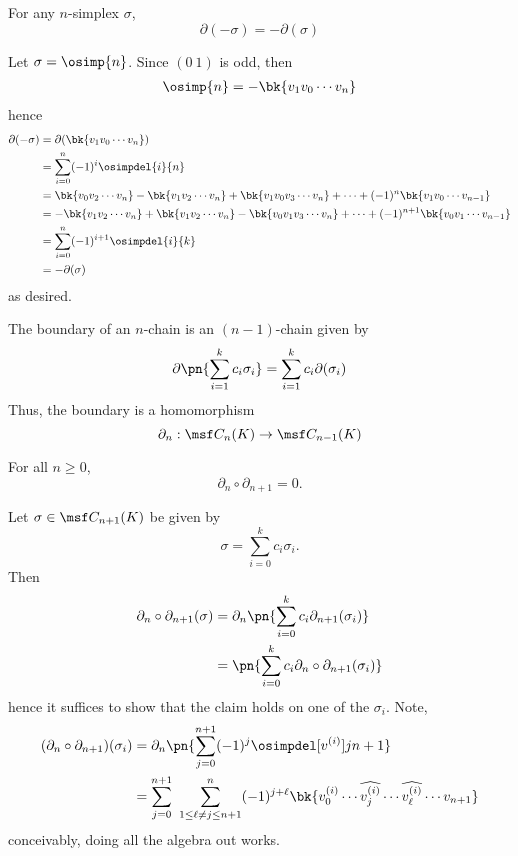 \begin{problem}[18.3]
  For any $n$-simplex $\sigma$,
  \[
    \partial(-\sigma) = -\partial(\sigma)
  \]
\end{problem}
\begin{solution}
  Let $\sigma = \osimp{n}$. Since $(0\ 1)$ is odd, then
  \begin{align*}
    \osimp{n} = -\bk{v_1v_0\cdots v_n}
  \end{align*}
  hence
  \begin{align*}
    \partial(-\sigma)
    &= \partial(\bk{v_1v_0\cdots v_n}) \\
    &= \sum_{i=0}^n (-1)^i \osimpdel{i}{n} \\
    &= \bk{v_0v_2\cdots v_n} - \bk{v_1v_2 \cdots v_n} + \bk{v_1v_0v_3\cdots v_n} + \cdots + (-1)^n\bk{v_1v_0\cdots v_{n-1}} \\
    &= -\bk{v_1v_2\cdots v_n} + \bk{v_1v_2 \cdots v_n} - \bk{v_0v_1v_3\cdots v_n} + \cdots + (-1)^{n+1}\bk{v_0v_1\cdots v_{n-1}} \\
    &= \sum_{i=0}^n (-1)^{i+1} \osimpdel{i}{k} \\
    &= -\partial(\sigma)
  \end{align*}
  as desired.
\end{solution}
\begin{definition}
  The boundary of an $n$-chain is an $(n-1)$-chain given by
  \[
    \partial\pn{\sum_{i=1}^k c_i \sigma_i}
    = \sum_{i=1}^k c_i\partial(\sigma_i)
  \]
  Thus, the boundary is a homomorphism
  \[
    \partial_n : \msf C_n(K) \to \msf C_{n-1}(K)
  \]
\end{definition}
\begin{problem}[18.4]
  For all $n \geq 0$,
  \[
    \partial_n \circ \partial_{n+1}=0.
  \]
\end{problem}
\begin{solution}
  Let $\sigma \in \msf C_{n+1}(K)$ be given by
  \[
    \sigma = \sum_{i=0}^k c_i \sigma_i.
  \]
  Then
  \begin{align*}
    \partial_n \circ \partial_{n+1}(\sigma)
    &= \partial_n \pn{\sum_{i=0}^k c_i \partial_{n+1}(\sigma_i)} \\
    &= \pn{\sum_{i=0}^k c_i \partial_n \circ \partial_{n+1}(\sigma_i)}
  \end{align*}
  hence it suffices to show that the claim holds on one of the $\sigma_i$. Note,
  \begin{align*}
    (\partial_n \circ \partial_{n+1})(\sigma_i)
    &= \partial_n\pn{\sum_{j=0}^{n+1} (-1)^j \osimpdel[v^{(i)}]{j}{n+1}} \\
    &= \sum_{j=0}^{n+1}\ \sum_{1 \leq \ell\neq j \leq n+1}^n (-1)^{j+\ell} \bk{v^{(i)}_0 \cdots \widehat{v^{(i)}_j} \cdots \widehat{v^{(i)}_\ell} \cdots v_{n+1}}
  \end{align*}
  conceivably, doing all the algebra out works.
\end{solution}
